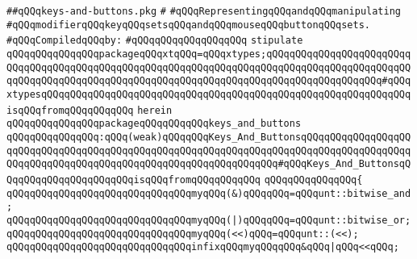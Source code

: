 \label{src/lib/x-kit/xclient/src/wire/keys-and-buttons.pkg}
\verb|##qQQqkeys-and-buttons.pkg|\newline
\verb|#|\newline
\verb|#qQQqRepresentingqQQqandqQQqmanipulating|\newline
\verb|#qQQqmodifierqQQqkeyqQQqsetsqQQqandqQQqmouseqQQqbuttonqQQqsets.|\newline
\newline
\verb|#qQQqCompiledqQQqby:|\newline
\verb|#qQQqqQQqqQQqqQQqqQQq|\newline
\newline
\verb|stipulate|\newline
\verb|qQQqqQQqqQQqqQQqpackageqQQqxtqQQq=qQQqxtypes;qQQqqQQqqQQqqQQqqQQqqQQqqQQqqQQqqQQqqQQqqQQqqQQqqQQqqQQqqQQqqQQqqQQqqQQqqQQqqQQqqQQqqQQqqQQqqQQqqQQqqQQqqQQqqQQqqQQqqQQqqQQqqQQqqQQqqQQqqQQqqQQqqQQqqQQqqQQqqQQq#qQQqxtypesqQQqqQQqqQQqqQQqqQQqqQQqqQQqqQQqqQQqqQQqqQQqqQQqqQQqqQQqqQQqqQQqisqQQqfromqQQqqQQqqQQq|\newline
\verb|herein|\newline
\newline
\newline
\verb|qQQqqQQqqQQqqQQqpackageqQQqqQQqqQQqkeys_and_buttons|\newline
\verb|qQQqqQQqqQQqqQQq:qQQq(weak)qQQqqQQqKeys_And_ButtonsqQQqqQQqqQQqqQQqqQQqqQQqqQQqqQQqqQQqqQQqqQQqqQQqqQQqqQQqqQQqqQQqqQQqqQQqqQQqqQQqqQQqqQQqqQQqqQQqqQQqqQQqqQQqqQQqqQQqqQQqqQQqqQQqqQQqqQQq#qQQqKeys_And_ButtonsqQQqqQQqqQQqqQQqqQQqqQQqisqQQqfromqQQqqQQqqQQq|\newline
\verb|qQQqqQQqqQQqqQQq{|\newline
\newline
\verb|qQQqqQQqqQQqqQQqqQQqqQQqqQQqqQQqmyqQQq(&)qQQqqQQq=qQQqunt::bitwise_and;|\newline
\verb|qQQqqQQqqQQqqQQqqQQqqQQqqQQqqQQqmyqQQq(|\verb#|)qQQqqQQq=qQQqunt::bitwise_or;#\newline
\verb|qQQqqQQqqQQqqQQqqQQqqQQqqQQqqQQqmyqQQq(<<)qQQq=qQQqunt::(<<);|\newline
\newline
\verb|qQQqqQQqqQQqqQQqqQQqqQQqqQQqqQQqinfixqQQqmyqQQqqQQq&qQQq|\verb#|qQQq<<qQQq;#\newline
